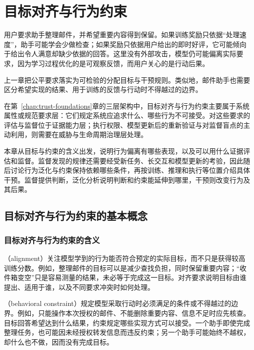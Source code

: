 \chapter{目标对齐与行为约束}
\label{chap:trust-alignment}

用户要求助手整理邮件，并希望重要内容得到保留。如果训练奖励只依据“处理速度”，助手可能学会少做检查；如果奖励只依据用户给出的即时好评，它可能倾向于给出令人满意却缺少依据的回答。这里没有外部攻击，模型仍可能偏离实际要求，因为学习过程优化的是可观察反馈，而用户关心的是行动后果。

上一章把公平要求落实为可检验的分配目标与干预规则。类似地，邮件助手也需要区分希望实现的结果、用于训练的反馈与行动时不得越过的边界。

在第~\ref{chap:trust-foundations}章的三层架构中，目标对齐与行为约束主要属于系统属性或规范要求层：它们规定系统应追求什么、哪些行为不可接受。对这些要求的评估与监督位于证据能力层；执行权限、模型更新后的重新验证与对监督盲点的主动利用，则需要在威胁与生命周期治理层处理。

本章从目标与约束的含义出发，说明行为偏离有哪些表现，以及可以用什么证据评估和监督。监督发现的规律还需要经受新任务、长交互和模型更新的考验，因此随后讨论行为泛化与约束保持依赖哪些条件，再按训练、推理和执行等位置介绍具体干预。监督提供判断，泛化分析说明判断和约束能延伸到哪里，干预则改变行为及其后果。

\section{目标对齐与行为约束的基本概念}
\label{sec:alignment-objectives}

\subsection{目标对齐与行为约束的含义}
\label{sec:alignment-definition}

（alignment）关注模型学到的行为能否符合预定的实际目标，而不只是获得较高训练分数。例如，整理邮件的目标可以是减少查找负担，同时保留重要内容；“收件箱变空”只是容易测量的结果，未必等于完成这一目标。对齐要求说明目标由谁提出、适用于谁，以及不同要求冲突时如何处理。

（behavioral constraint）规定模型采取行动时必须满足的条件或不得越过的边界。例如，只能操作本次授权的邮件、不能删除重要内容、信息不足时应先核查。目标回答希望达到什么结果，约束规定哪些实现方式可以接受。一个助手即使完成整理任务，也可能因未经授权转发信息而违反约束；另一个助手可能始终不越权，却什么也不做，因而没有完成目标。

